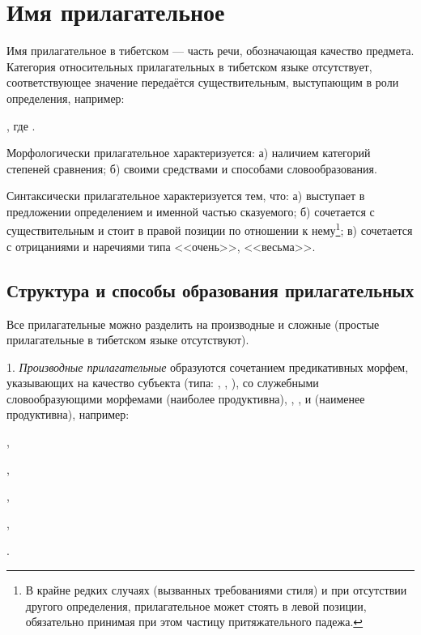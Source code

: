 \section{Имя прилагательное}

Имя прилагательное в тибетском --- часть речи, обозначающая качество предмета. Категория относительных прилагательных в тибетском языке отсутствует, соответствующее значение передаётся существительным, выступающим в роли определения, например:
\begin{prfsample}
    \item {}, где .
\end{prfsample}

Морфологически прилагательное характеризуется: а) наличием категорий степеней сравнения; б) своими средствами и способами словообразования.

Синтаксически прилагательное характеризуется тем, что:
а) выступает в предложении определением и именной частью сказуемого;
б) сочетается с существительным и стоит в правой позиции по отношении к нему\footnote[27]{В крайне редких случаях (вызванных требованиями стиля) и при отсутствии другого определения, прилагательное может стоять в левой позиции, обязательно принимая при этом частицу притяжательного падежа.};
в) сочетается с отрицаниями и наречиями типа <<очень>>, <<весьма>>.

\subsection{Структура и способы образования прилагательных}

Все прилагательные можно разделить на производные и сложные (простые прилагательные в тибетском языке отсутствуют).

1. \emph{Производные прилагательные} образуются сочетанием предикативных морфем, указывающих на качество субъекта (типа: , , ), со служебными словообразующими морфемами  (наиболее продуктивна), , ,  и  (наименее продуктивна), например:
\begin{prfsample}
    \item {},
    \item {},
    \item {},
    \item {},
    \item {}.
\end{prfsample}

